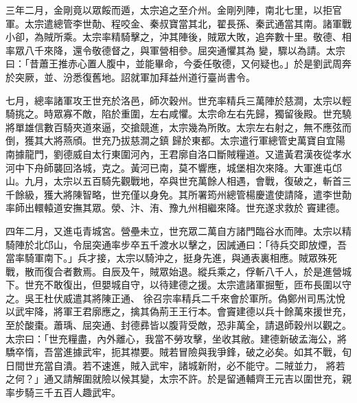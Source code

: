 \begin{pinyinscope}
 三年二月，金剛竟以眾餒而遁，太宗追之至介州。金剛列陣，南北七里，以拒官軍。太宗遣總管李世勣、程咬金、秦叔寶當其北，翟長孫、秦武通當其南。諸軍戰小卻，為賊所乘。太宗率精騎擊之，沖其陣後，賊眾大敗，追奔數十里。敬德、相率眾八千來降，還令敬德督之，與軍營相參。屈突通懼其為
 變，驟以為請。太宗曰：「昔蕭王推赤心置人腹中，並能畢命，今委任敬德，又何疑也。」於是劉武周奔於突厥，並、汾悉復舊地。詔就軍加拜益州道行臺尚書令。



 七月，總率諸軍攻王世充於洛邑，師次穀州。世充率精兵三萬陣於慈澗，太宗以輕騎挑之。時眾寡不敵，陷於重圍，左右咸懼。太宗命左右先歸，獨留後殿。世充驍將單雄信數百騎夾道來逼，交搶競進，太宗幾為所敗。太宗左右射之，無不應弦而倒，獲其大將燕頎。世充乃拔慈澗之鎮
 歸於東都。太宗遣行軍總管史萬寶自宜陽南據龍門，劉德威自太行東圍河內，王君廓自洛口斷賊糧道。又遣黃君漢夜從孝水河中下舟師襲回洛城，克之。黃河已南，莫不響應，城堡相次來降。大軍進屯邙山。九月，太宗以五百騎先觀戰地，卒與世充萬餘人相遇，會戰，復破之，斬首三千餘級，獲大將陳智略，世充僅以身免。其所署筠州總管楊慶遣使請降，遣李世勣率師出轘轅道安撫其眾。滎、汴、洧、豫九州相繼來降。世充遂求救於
 竇建德。



 四年二月，又進屯青城宮。營壘未立，世充眾二萬自方諸門臨谷水而陣。太宗以精騎陣於北邙山，令屈突通率步卒五千渡水以擊之，因誡通曰：「待兵交即放煙，吾當率騎軍南下。」兵才接，太宗以騎沖之，挺身先進，與通表裏相應。賊眾殊死戰，散而復合者數焉。自辰及午，賊眾始退。縱兵乘之，俘斬八千人，於是進營城下。世充不敢復出，但嬰城自守，以待建德之援。太宗遣諸軍掘塹，匝布長圍以守之。吳王杜伏威遣其將陳正通、
 徐召宗率精兵二千來會於軍所。偽鄭州司馬沈悅以武牢降，將軍王君廓應之，擒其偽荊王王行本。會竇建德以兵十餘萬來援世充，至於酸棗。蕭瑀、屈突通、封德彞皆以腹背受敵，恐非萬全，請退師穀州以觀之。太宗曰：「世充糧盡，內外離心，我當不勞攻擊，坐收其敝。建德新破孟海公，將驕卒惰，吾當進據武牢，扼其襟要。賊若冒險與我爭鋒，破之必矣。如其不戰，旬日間世充當自潰。若不速進，賊入武牢，諸城新附，必不能守。二賊並力，
 將若之何？」通又請解圍就險以候其變，太宗不許。於是留通輔齊王元吉以圍世充，親率步騎三千五百人趣武牢。




\end{pinyinscope}
